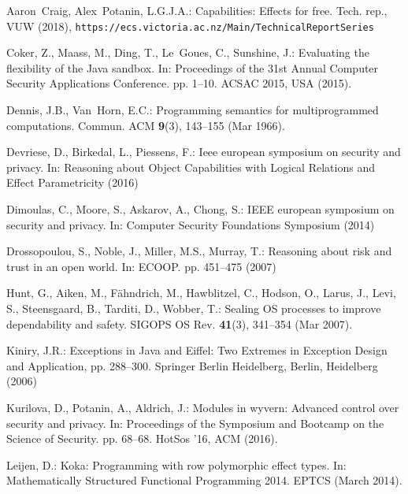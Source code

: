 \documentclass[runningheads]{llncs}
\begin{document}
\begin{thebibliography}{10}
\scriptsize
\vspace{-0.2cm}
\providecommand{\url}[1]{\texttt{#1}}
\providecommand{\urlprefix}{URL }
\providecommand{\doi}[1]{https://doi.org/#1}

Aaron~Craig, Alex~Potanin, L.G.J.A.: Capabilities: Effects for free. Tech.
  rep., VUW (2018), \url{https://ecs.victoria.ac.nz/Main/TechnicalReportSeries}

Coker, Z., Maass, M., Ding, T., Le~Goues, C., Sunshine, J.: Evaluating the
  flexibility of the Java sandbox. In: Proceedings of the 31st Annual Computer
  Security Applications Conference. pp. 1--10. ACSAC 2015, USA (2015).

Dennis, J.B., Van~Horn, E.C.: Programming semantics for multiprogrammed
  computations. Commun. ACM  \textbf{9}(3),  143--155 (Mar 1966).

Devriese, D., Birkedal, L., Piessens, F.: Ieee european symposium on security
  and privacy. In: Reasoning about Object Capabilities with Logical Relations
  and Effect Parametricity (2016)

Dimoulas, C., Moore, S., Askarov, A., Chong, S.: IEEE european symposium on
  security and privacy. In: Computer Security Foundations Symposium (2014)

Drossopoulou, S., Noble, J., Miller, M.S., Murray, T.: Reasoning about risk and
  trust in an open world. In: ECOOP. pp. 451--475 (2007)

Hunt, G., Aiken, M., F\"{a}hndrich, M., Hawblitzel, C., Hodson, O., Larus, J.,
  Levi, S., Steensgaard, B., Tarditi, D., Wobber, T.: Sealing OS processes to
  improve dependability and safety. SIGOPS OS Rev. \textbf{41}(3),
  341--354 (Mar 2007).

Kiniry, J.R.: Exceptions in Java and Eiffel: Two Extremes in Exception Design
  and Application, pp. 288--300. Springer Berlin Heidelberg, Berlin, Heidelberg
  (2006)

Kurilova, D., Potanin, A., Aldrich, J.: Modules in wyvern: Advanced control
  over security and privacy. In: Proceedings of the Symposium and Bootcamp on
  the Science of Security. pp. 68--68. HotSos '16, ACM (2016).

Leijen, D.: Koka: Programming with row polymorphic effect types. In:
  Mathematically Structured Functional Programming 2014. EPTCS (March 2014).


\end{thebibliography}
\end{document}
